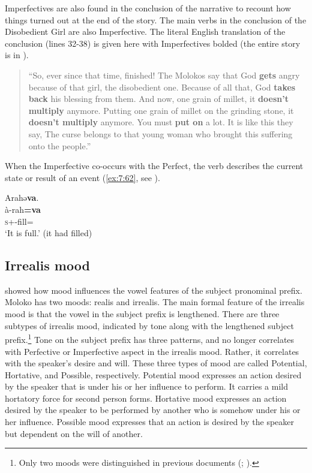 Imperfectives are also found in the conclusion of the narrative to recount how things turned out at the end of the story. The main verbs in the conclusion of the Disobedient Girl are also Imperfective. The literal English translation of the conclusion (lines 32-38) is given here with Imperfectives bolded (the entire story is in ).

\begin{quote}{“So, ever since that time, finished! The Molokos say that God \textbf{gets} angry because of that girl, the disobedient one. Because of all that, God \textbf{takes back} his blessing from them. And now, one grain of millet, it \textbf{doesn’t multiply} anymore. Putting one grain of millet on the grinding stone, it \textbf{doesn’t multiply} anymore. You must \textbf{put on} a lot. It is like this they say, The curse belongs to that young woman who brought this suffering onto the people.”}\end{quote}

When the Imperfective  co-occurs with the Perfect, the verb describes the current state or result of an event (\ref{ex:7:62}, see ).

\ea\label{ex:7:62}
Arahə\textbf{va}.\\
\gll  à-rah\textbf{=va}\\
      \textsc{s}+{\PFV}-fill={\PRF}\\
\glt  ‘It is full.’ (it had filled)\\
\z 
{}
\subsection{Irrealis mood}\label{sec:7.4.3}
\hypertarget{RefHeading1212261525720847}{}
\citet{FriesenMamalis2008} showed how mood influences the vowel features of the subject pronominal prefix. Moloko has two moods: realis and irrealis. The main formal feature of the irrealis mood is that the vowel in the subject prefix is lengthened. There are three subtypes of irrealis mood, indicated by tone along with the lengthened subject prefix.\footnote{Only two moods were distinguished in previous documents (\citealt{FriesenMamalis2008}; \citealt{Boyd2003}).} Tone on the subject prefix has three patterns, and no longer correlates with Perfective or Imperfective aspect in the irrealis mood. Rather, it correlates with the speaker’s desire and will. These three types of mood are called Potential, Hortative, and Possible, respectively. Potential mood expresses an action desired by the speaker that is under his or her influence to perform. It carries a mild hortatory force for second person forms. Hortative mood expresses an action desired by the speaker to be performed by another who is somehow under his or her influence. Possible mood expresses that an action is desired by the speaker but dependent on the will of another.

